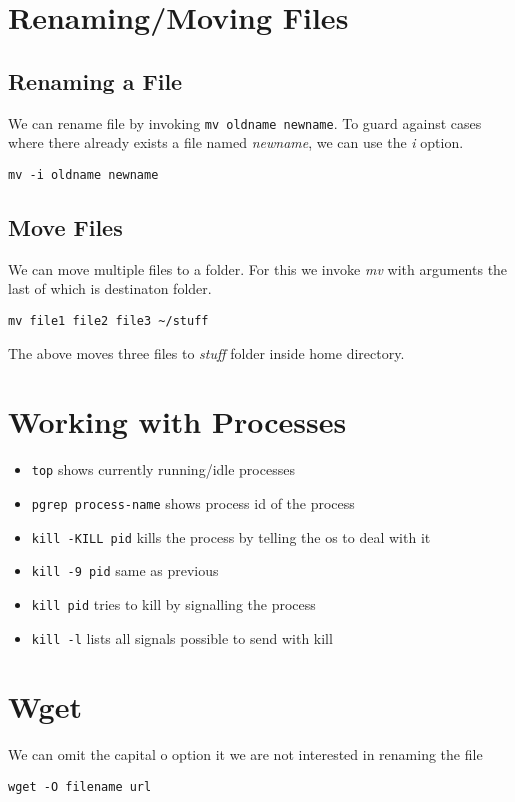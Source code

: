 \documentclass[a4paper, 12pt]{article}
\begin{document}
\section{Renaming/Moving Files}
\subsection{Renaming a File}
We can rename file by invoking \verb|mv oldname newname|.
To guard against cases where there already exists a file named \emph{newname}, we can use the \emph{i} option.
\begin{verbatim}
mv -i oldname newname
\end{verbatim}
\subsection{Move Files}
We can move multiple files to a folder. For this we invoke \emph{mv} with arguments the last of which is destinaton folder.
\begin{verbatim}
mv file1 file2 file3 ~/stuff
\end{verbatim}
The above moves three files to \emph{stuff} folder inside home directory.

\section{Working with Processes}
\begin{itemize}
	\item \verb|top| shows currently running/idle processes
	\item \verb|pgrep process-name| shows process id of the process
	\item \verb|kill -KILL pid| kills the process by telling the os to deal with it
	\item \verb|kill -9 pid| same as previous
	\item \verb|kill pid| tries to kill by signalling the process
	\item \verb|kill -l| lists all signals possible to send with kill
\end{itemize}

\section{Wget}
We can omit the capital o option it we are not interested in renaming the file
\begin{verbatim}
wget -O filename url
\end{verbatim}
\end{document}
